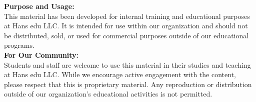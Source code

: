 \thispagestyle{empty}%
\begin{center}
  \begin{minipage}{1.0\textwidth}
    {\textbf{Purpose and Usage:}}\\[0.2cm]
    {\footnotesize
    This material has been developed for internal training and educational 
    purposes at Hans edu LLC. It is intended for use within our organization 
    and should not be distributed, sold, or used for commercial purposes 
    outside of our educational programs.}\\[1cm]
    
    {\textbf{For Our Community:}}\\[0.2cm]
    {\footnotesize
    Students and staff are welcome to use this material in their studies and 
    teaching at Hans edu LLC. While we encourage active engagement with the 
    content, please respect that this is proprietary material. Any 
    reproduction or distribution outside of our organization's educational 
    activities is not permitted.}\\[1cm]
    

\end{minipage}
\end{center}
